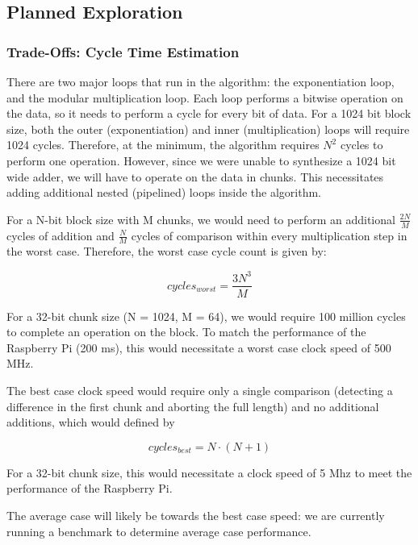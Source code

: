 \documentclass[12pt]{article}
\begin{document}
\subsection{Planned Exploration}

\subsubsection{Trade-Offs: Cycle Time Estimation}

There are two major loops that run in the algorithm: the exponentiation loop,
and the modular multiplication loop. Each loop performs a bitwise operation
on the data, so it needs to perform a cycle for every bit of data. For a
1024 bit block size, both the outer (exponentiation) and inner (multiplication)
loops will require 1024 cycles. Therefore, at the minimum, the algorithm
requires ${N}^2$ cycles to perform one operation. However, since we were unable
to synthesize a 1024 bit wide adder, we will have to operate on the data
in chunks. This necessitates adding additional nested (pipelined) loops
inside the algorithm.

For a N-bit block size with M chunks, we would need to perform an additional $\frac{2N}{M}$
cycles of addition and $\frac{N}{M}$ cycles of comparison within every multiplication step in
the worst case. Therefore, the worst case cycle count is given by:

\begin{equation}
cycles_{worst}=\frac{3N^{3}}{M}
\end{equation}

For a 32-bit chunk size (N = 1024, M = 64), we would require 100 million cycles
to complete an operation on the block. To match the performance of the
Raspberry Pi (200 ms), this would necessitate a worst case clock speed of 500 MHz.

The best case clock speed would require only a single comparison (detecting a difference
in the first chunk and aborting the full length) and no additional additions,
which would defined by

\begin{equation}
cycles_{best}=N\cdot (N+1)
\end{equation}

For a 32-bit chunk size, this would necessitate a clock speed of 5 Mhz to meet the
performance of the Raspberry Pi.

The average case will likely be towards the best case speed: we are currently
running a benchmark to determine average case performance.
\end{document}
